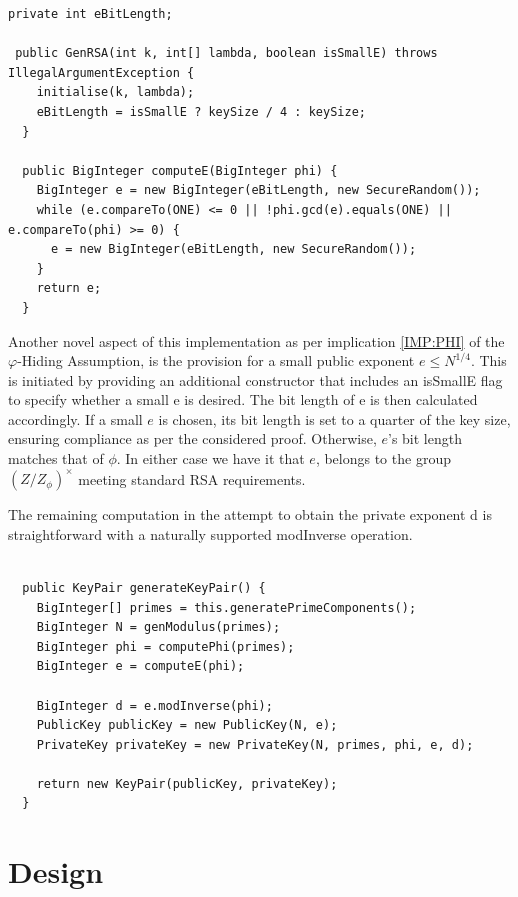 \documentclass[]{final_report}
\theoremstyle{definition}
\begin{document}
\begin{lstlisting}[caption= Adaptation for specification of small e]
 private int eBitLength;
 
 public GenRSA(int k, int[] lambda, boolean isSmallE) throws IllegalArgumentException {
    initialise(k, lambda);
    eBitLength = isSmallE ? keySize / 4 : keySize;
  }
  
  public BigInteger computeE(BigInteger phi) {
    BigInteger e = new BigInteger(eBitLength, new SecureRandom());
    while (e.compareTo(ONE) <= 0 || !phi.gcd(e).equals(ONE) || e.compareTo(phi) >= 0) {
      e = new BigInteger(eBitLength, new SecureRandom());
    }
    return e;
  }
\end{lstlisting}

Another novel aspect of this implementation as per implication \ref{IMP:PHI} of the $\varphi$-Hiding Assumption, is the provision for a small public exponent \( e \leqslant N^{1/4} \). This is initiated by providing an additional constructor that includes an isSmallE flag to specify whether a small e is desired. The bit length of e is then calculated accordingly.  If a small \( e \) is chosen, its bit length is set to a quarter of the key size, ensuring compliance as per the considered proof. Otherwise, \( e \)'s bit length matches that of \( \phi \). In either case we have it that \( e \), belongs to the group \( (Z/ Z_{\phi})^{\times} \) meeting standard RSA requirements.

The remaining computation in the attempt to obtain the private exponent d is straightforward with a naturally supported modInverse operation.
\begin{lstlisting}[caption=Java Implementation of Key Generation (\ref{subSec:keygen})]
  
  public KeyPair generateKeyPair() {
    BigInteger[] primes = this.generatePrimeComponents();
    BigInteger N = genModulus(primes);
    BigInteger phi = computePhi(primes);
    BigInteger e = computeE(phi);
    
    BigInteger d = e.modInverse(phi);
    PublicKey publicKey = new PublicKey(N, e);
    PrivateKey privateKey = new PrivateKey(N, primes, phi, e, d);

    return new KeyPair(publicKey, privateKey);
  }

\end{lstlisting}


\section{Design}
\end{document}
